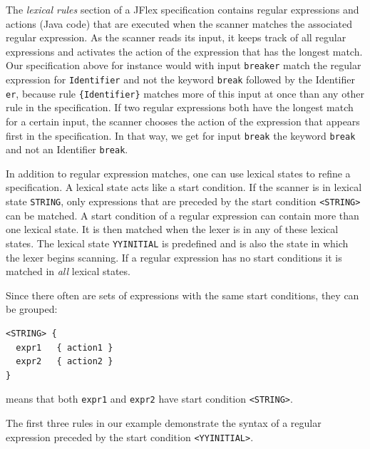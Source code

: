 
The \emph{lexical rules} section of a JFlex specification contains
regular expressions and actions (Java code) that are executed when the
scanner matches the associated regular expression. As the scanner reads
its input, it keeps track of all regular expressions and activates the
action of the expression that has the longest match. Our specification
above for instance would with input \texttt{breaker} match the regular
expression for \texttt{Identifier} and not the keyword \texttt{break}
followed by the Identifier \texttt{er}, because rule
\texttt{\{Identifier\}} matches more of this input at once than any
other rule in the specification. If two regular expressions both have
the longest match for a certain input, the scanner chooses the action of
the expression that appears first in the specification. In that way, we
get for input \texttt{break} the keyword \texttt{break} and not an
Identifier \texttt{break}.

In addition to regular expression matches, one can use lexical states to
refine a specification. A lexical state acts like a start condition. If
the scanner is in lexical state \texttt{STRING}, only expressions that
are preceded by the start condition
\texttt{\textless{}STRING\textgreater{}} can be matched. A start
condition of a regular expression can contain more than one lexical
state. It is then matched when the lexer is in any of these lexical
states. The lexical state \texttt{YYINITIAL} is predefined and is also
the state in which the lexer begins scanning. If a regular expression
has no start conditions it is matched in \emph{all} lexical states.

Since there often are sets of expressions with the same start
conditions, they can be grouped:

\begin{verbatim}
<STRING> {
  expr1   { action1 }
  expr2   { action2 }
}
\end{verbatim}

means that both \texttt{expr1} and \texttt{expr2} have start condition
\texttt{\textless{}STRING\textgreater{}}.

The first three rules in our example demonstrate the syntax of a regular
expression preceded by the start condition
\texttt{\textless{}YYINITIAL\textgreater{}}.


